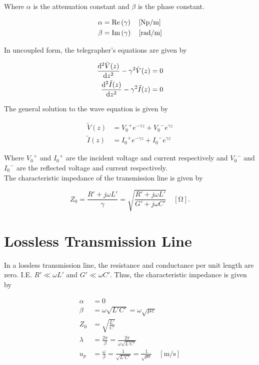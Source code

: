 \documentclass{report}
\begin{document}
Where $\alpha$ is the attenuation constant and $\beta$ is the phase constant.

\begin{align*}
	\alpha & = \Re \lt( \gamma \rt)\quad [\unit{\neper\per\meter}]  \\
	\beta  & = \Im \lt( \gamma \rt)\quad [\unit{\radian\per\meter}]
\end{align*}

In uncoupled form, the telegrapher's equations are given by

\begin{align*}
	\dv[2]{\tilde{V}(z)}{z} - \gamma^2 \tilde{V}(z) & = 0 \\
	\dv[2]{\tilde{I}(z)}{z} - \gamma^2 \tilde{I}(z) & = 0
\end{align*}

The general solution to the wave equation is given by

\begin{align*}
	\tilde{V}(z) & = {V_0}^+ e^{-\gamma z} + {V_0}^- e^{\gamma z} \\
	\tilde{I}(z) & = {I_0}^+ e^{-\gamma z} + {I_0}^- e^{\gamma z}
\end{align*}

Where ${V_0}^+$ and ${I_0}^+$ are the incident voltage and current respectively and ${V_0}^-$ and ${I_0}^-$ are the reflected voltage and current respectively.\\

The characteristic impedance of the transmission line is given by

\[
	Z_0 = \frac{R' + j\omega L'}{\gamma} = \sqrt{\frac{R' + j\omega L'}{G' + j\omega C'}} \quad [\unit{\ohm}]
	.\]

\section{Lossless Transmission Line}

In a lossless transmission line, the resistance and conductance per unit length are zero. I.E. $R'\ll \omega L'$ and $G'\ll \omega C'$. Thus, the characteristic impedance is given by

\begin{align*}
	\alpha  & = 0                                                                                                               \\
	\beta   & = \omega \sqrt{L'C'} = \omega \sqrt{\mu\varepsilon}                                                               \\
	Z_0     & = \sqrt{\frac{L'}{C'}}                                                                                            \\
	\lambda & = \frac{2\pi}{\beta} = \frac{2\pi}{\omega \sqrt{L'C'}}                                                            \\
	u_p     & = \frac{\omega}{\beta} = \frac{1}{\sqrt{L'C'}} = \frac{1}{\sqrt{\mu\varepsilon}} \quad [\unit{\meter\per\second}]
\end{align*}
\end{document}
